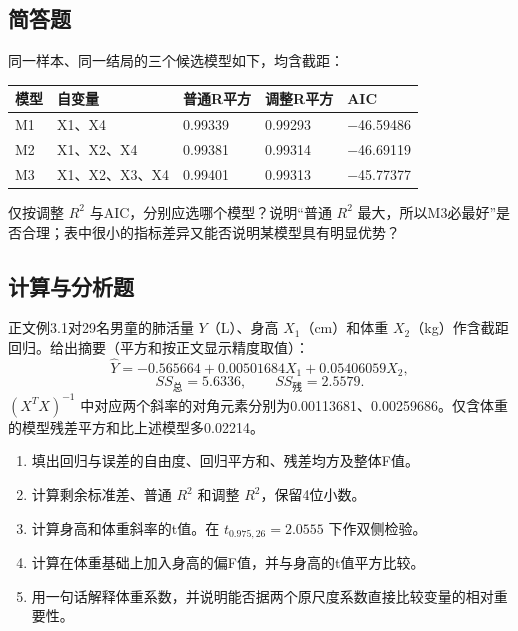 \subsection{简答题}

\par\addvspace{6pt}\noindent\begin{minipage}{\linewidth}


同一样本、同一结局的三个候选模型如下，均含截距：

\begin{center}\small\setlength{\tabcolsep}{5pt}\renewcommand{\arraystretch}{1.18}\begin{tabular}{@{}lllll@{}}
\toprule
模型 & 自变量 & 普通R平方 & 调整R平方 & AIC \\
\midrule

M1 & X1、X4 & 0.99339 & 0.99293 & −46.59486 \\
M2 & X1、X2、X4 & 0.99381 & 0.99314 & −46.69119 \\
M3 & X1、X2、X3、X4 & 0.99401 & 0.99313 & −45.77377 \\
\bottomrule\end{tabular}\end{center}

仅按调整 \(R^2\) 与AIC，分别应选哪个模型？说明``普通 \(R^2\) 最大，所以M3必最好''是否合理；表中很小的指标差异又能否说明某模型具有明显优势？



\end{minipage}\par\vspace{4pt}

\subsection{计算与分析题}


正文例3.1对29名男童的肺活量 \(Y\)（L）、身高 \(X_1\)（cm）和体重 \(X_2\)（kg）作含截距回归。给出摘要（平方和按正文显示精度取值）： \[\hat Y=-0.565664+0.00501684X_1+0.05406059X_2,\] \[SS_{\text{总}}=5.6336,\qquad SS_{\text{残}}=2.5579.\] \((X^TX)^{-1}\) 中对应两个斜率的对角元素分别为0.00113681、0.00259686。仅含体重的模型残差平方和比上述模型多0.02214。

\begin{enumerate}
\def\labelenumi{\arabic{enumi}.}
\tightlist
\item
  填出回归与误差的自由度、回归平方和、残差均方及整体F值。
\item
  计算剩余标准差、普通 \(R^2\) 和调整 \(R^2\)，保留4位小数。
\item
  计算身高和体重斜率的t值。在 \(t_{0.975,26}=2.0555\) 下作双侧检验。
\item
  计算在体重基础上加入身高的偏F值，并与身高的t值平方比较。
\item
  用一句话解释体重系数，并说明能否据两个原尺度系数直接比较变量的相对重要性。
\end{enumerate}



